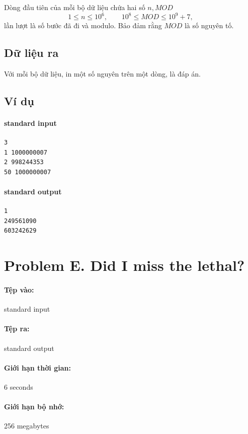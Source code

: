 \documentclass[11pt]{article}
\begin{document}
Dòng đầu tiên của mỗi bộ dữ liệu chứa hai số \(n,MOD\)
\[
  1\le n\le 10^6,\qquad 10^8\le MOD\le 10^9+7,
\]
lần lượt là số bước đã đi và modulo. Bảo đảm rằng \(MOD\) là số nguyên tố.

\subsection*{Dữ liệu ra}

Với mỗi bộ dữ liệu, in một số nguyên trên một dòng, là đáp án.

\subsection*{Ví dụ}

\paragraph{standard input}
\begin{verbatim}
3
1 1000000007
2 998244353
50 1000000007
\end{verbatim}

\paragraph{standard output}
\begin{verbatim}
1
249561090
603242629
\end{verbatim}

\section{Problem E. Did I miss the lethal?}

\paragraph{Tệp vào:} standard input
\paragraph{Tệp ra:} standard output
\paragraph{Giới hạn thời gian:} 6 seconds
\paragraph{Giới hạn bộ nhớ:} 256 megabytes
\end{document}
